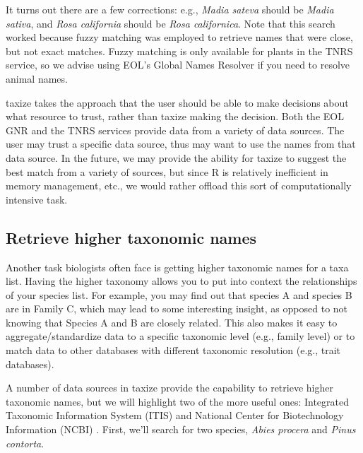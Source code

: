 \documentclass[10pt]{article}\usepackage[]{graphicx}\usepackage[]{color}
\begin{document}
It turns out there are a few corrections: e.g., \emph{Madia sateva} should be \emph{Madia sativa}, and \emph{Rosa california} should be \emph{Rosa californica}. Note that this search worked because fuzzy matching was employed to retrieve names that were close, but not exact matches. Fuzzy matching is only available for plants in the TNRS service, so we advise using EOL's Global Names Resolver if you need to resolve animal names.

taxize takes the approach that the user should be able to make decisions about what resource to trust, rather than taxize making the decision. Both the EOL GNR and the TNRS services provide data from a variety of data sources. The user may trust a specific data source, thus may want to use the names from that data source. In the future, we may provide the ability for taxize to suggest the best match from a variety of sources, but since R is relatively inefficient in memory management, etc., we would rather offload this sort of computationally intensive task.

\subsection*{Retrieve higher taxonomic names}
Another task biologists often face is getting higher taxonomic names for a taxa list. Having the higher taxonomy allows you to put into context the relationships of your species list. For example, you may find out that species A and species B are in Family C, which may lead to some interesting insight, as opposed to not knowing that Species A and B are closely related. This also makes it easy to aggregate/standardize data to a specific taxonomic level (e.g., family level) or to match data to other databases with different taxonomic resolution (e.g., trait databases).

A number of data sources in taxize provide the capability to retrieve higher taxonomic names, but we will highlight two of the more useful ones: Integrated Taxonomic Information System (ITIS) \cite{itis} and National Center for Biotechnology Information (NCBI) \cite{federhen}. First, we'll search for two species, \emph{Abies procera} and \emph{Pinus contorta}.
\end{document}
